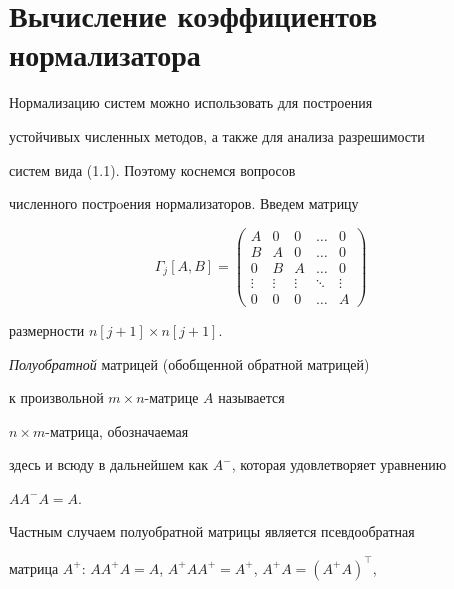 \section{Вычисление коэффициентов нормализатора}





Нормализацию систем можно использовать для построения


устойчивых численных методов, а также для анализа разрешимости


систем вида (1.1). Поэтому коснемся вопросов


численного пострoения нормализаторов. Введем матрицу


\begin{equation}


\Gamma _j[A,B]=


\begin{pmatrix} A & 0 & 0 & \dotsc & 0\\


B & A & 0 & \dotsc & 0\\


0 & B & A & \dotsc & 0\\


\vdots & \vdots & \vdots & \ddots & \vdots \\


0 & 0 & 0 & \dotsc & A\end{pmatrix}


\end{equation}


размерности $n[j+1]\times n[j+1]$.





\begin{defns}


{\em Полуобратной} матрицей (обобщенной обратной матрицей)


к произвольной $m\times n$-матрице $A$ называется


$n\times m$-матрица, обозначаемая


здесь и всюду в дальнейшем как $A^-$, которая удовлетворяет уравнению


$AA^{-}A = A$.


\end{defns}





Частным случаем полуобратной матрицы является псевдообратная


матрица $A^{+}$: $AA^{+}A=A$, $A^{+}AA^{+}=A^{+}$, $A^{+}A=(A^{+}A)^{\top }$,



